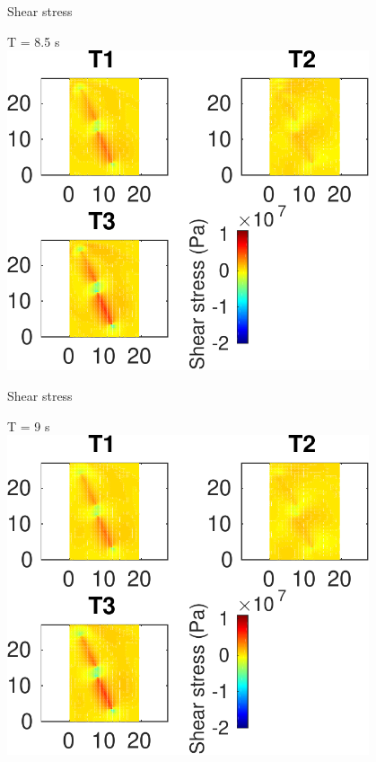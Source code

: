 \documentclass{beamer}
\begin{document}
\begin{frame}
 {Shear stress}
 
 \centering \Large T = 8.5 s\\
 \includegraphics[width=0.8\textwidth]{images/horizontal_00091}
 
\end{frame}

\begin{frame}
 {Shear stress}
 
 \centering \Large T = 9 s\\
 \includegraphics[width=0.8\textwidth]{images/horizontal_00096}
 
\end{frame}
\end{document}
